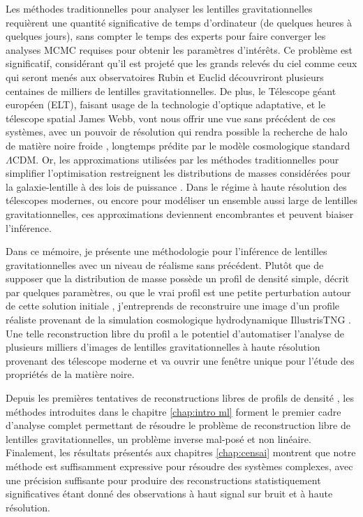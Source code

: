 Les méthodes traditionnelles pour analyser les lentilles gravitationnelles requièrent une quantité 
significative de temps d’ordinateur (de quelques heures à quelques jours), sans compter le temps des 
experts pour faire converger les analyses MCMC requises pour obtenir les paramètres d'intérêts. 
Ce problème est significatif, considérant qu'il est projeté que  
les grands relevés du ciel comme ceux qui seront menés aux observatoires Rubin et Euclid découvriront plusieurs 
centaines de milliers de lentilles gravitationnelles.  
De plus, le Télescope géant européen (ELT), faisant usage de la technologie d'optique adaptative, 
et le télescope spatial James Webb, vont nous offrir une vue sans précédent de ces systèmes, avec un 
pouvoir de résolution qui rendra possible la recherche de halo de matière noire froide \citep[p. ex.][]{Coogan2020}, 
longtemps prédite par le modèle cosmologique standard $\Lambda$CDM. 
Or, les approximations utilisées par les méthodes 
traditionnelles pour simplifier l'optimisation 
restreignent les distributions de masses considérées pour la galaxie-lentille à des lois de puissance \citep[p. ex.][]{Nightingale2018,Etherington2022}. 
Dans le régime à haute résolution des télescopes modernes, ou encore 
pour modéliser un ensemble aussi large de lentilles gravitationnelles, ces approximations deviennent 
encombrantes et peuvent biaiser l'inférence.

Dans ce mémoire, je présente une méthodologie pour l'inférence de lentilles gravitationnelles avec 
un niveau de réalisme sans précédent. Plutôt que de supposer que la distribution de masse possède 
un profil de densité simple, décrit par quelques paramètres, ou que le vrai profil est une petite perturbation 
autour de cette solution initiale \citep{Birrer2015,Birrer2018}, j'entreprends de reconstruire une image d'un profile réaliste 
provenant de la simulation cosmologique hydrodynamique IllustrisTNG \citep{Nelson2018}. 
Une telle reconstruction libre du profil a le potentiel d'automatiser l'analyse de plusieurs 
milliers d'images de lentilles gravitationnelles à haute résolution provenant des télescope 
moderne et va ouvrir une fenêtre unique pour l'étude des propriétés de la matière noire. 


Depuis les premières 
tentatives de reconstructions libres de profils de densité \citep{Saha1997}, 
les méthodes introduites dans le chapitre \ref{chap:intro ml} forment le premier cadre d'analyse 
complet permettant de résoudre le problème de reconstruction libre de lentilles 
gravitationnelles, un problème inverse mal-posé et non linéaire. 
Finalement, les résultats présentés aux chapitres \ref{chap:censai} montrent que notre 
méthode est suffisamment expressive pour résoudre des systèmes complexes, avec une précision 
suffisante pour produire des reconstructions 
statistiquement significatives étant donné des observations à haut signal sur bruit et  
à haute résolution.



